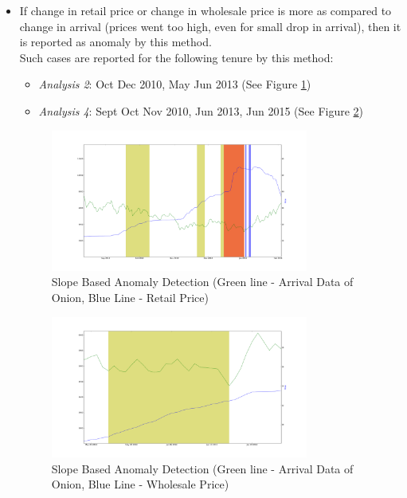 \documentclass[a4paper,10pt]{report}
\begin{document}
		\begin{itemize}
			\item If change in retail price or change in wholesale price is more as compared to change in arrival (prices went too high, even for small drop in arrival), then it is reported as anomaly by this method.\\
			
			Such cases are reported for the following tenure by this method:
			\begin{itemize}
				\item \textit{Analysis 2}: Oct Dec 2010, May Jun 2013 (See Figure \ref{fig:12121})
				\item \textit{Analysis 4}: Sept Oct Nov 2010, Jun 2013, Jun 2015 (See Figure \ref{fig:12141})
			\end{itemize}	
			
			\begin{figure}[H]
		    	\centering
  		    	\includegraphics[width=0.8\textwidth]{graphs/12121.png}
		    	\caption{Slope Based Anomaly Detection (Green line - Arrival Data of Onion, Blue Line - Retail Price)}
		    	\label{fig:12121}
			\end{figure}
			
			\begin{figure}[H]
		    	\centering
  		    	\includegraphics[width=0.8\textwidth]{graphs/12141.png}
		    	\caption{Slope Based Anomaly Detection (Green line - Arrival Data of Onion, Blue Line - Wholesale Price)}
		    	\label{fig:12141}
			\end{figure}
			

\end{itemize}
\end{document}
